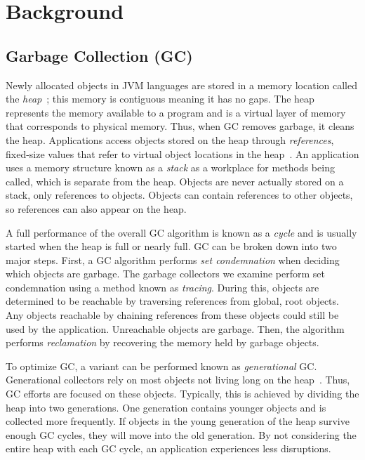 \documentclass{sig-alternate}
\begin{document}
\section{Background}
\label{sec:background}


\subsection{Garbage Collection (GC)}
\label{sec:garbageCollection}

Newly allocated objects in JVM languages are stored in a memory location called
the \emph{heap}~\cite{oracle:heap}; this memory is contiguous meaning it has no gaps. The heap represents the memory available to a program and is a virtual layer of memory that corresponds to physical memory.
Thus, when GC removes garbage, it cleans the heap.
Applications access objects stored on the heap through \emph{references},
fixed-size values that refer to virtual object locations in the heap~\cite{reilly:reference}. 
An application uses a memory structure known
as a \emph{stack} as a workplace for methods being called, 
which is separate from the heap. Objects are never actually
stored on a stack, only references to objects.
Objects can contain references to other objects, so references can also appear on the heap.

A full
performance of the overall GC algorithm is known as a \emph{cycle} and
is usually started when the heap is full or nearly full. GC can be broken down into two major steps.
First, a GC algorithm performs \emph{set condemnation} when deciding which objects are 
garbage. The garbage collectors we examine perform set condemnation using a method 
known as \emph{tracing}. During this, objects are determined to be reachable by 
traversing references from global, root objects. Any objects reachable by chaining references
from these objects could still be used by the application. 
Unreachable objects are garbage. Then, the algorithm performs 
\emph{reclamation} by recovering the memory held by garbage objects.

To optimize GC, a variant can be performed known as \emph{generational} GC.
Generational collectors rely on most objects not living long on the 
heap~\cite{Tene:C4}. Thus, GC efforts are focused on these objects. Typically, this is achieved
by dividing the heap into two generations. One generation contains younger objects and
is collected more frequently. If objects in the young generation of the heap survive
enough GC cycles, they will move into the old generation. By not considering the entire
heap with each GC cycle, an application experiences less disruptions.
\end{document}
